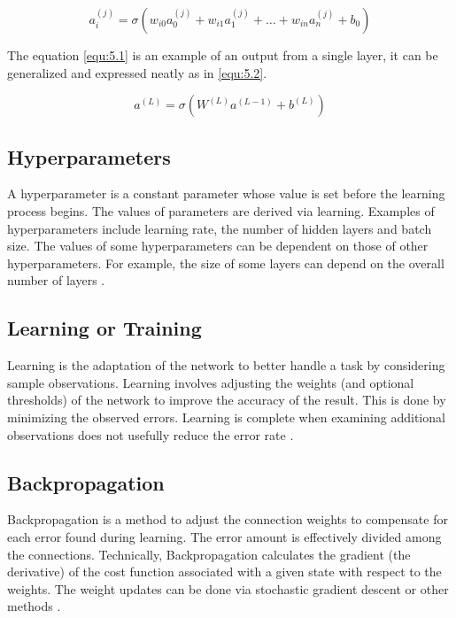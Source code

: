 \documentclass[12pt, a4paper]{report}
\begin{document}
\begin{equation}
    \label{equ:5.1}
    a_i^{(j)} = \sigma(w_{i0}a_0^{(j)} + w_{i1}a_1^{(j)} + \hdots + w_{in}a_n^{(j)} + b_0)
\end{equation}

The equation \eqref{equ:5.1} is an example of an output from a single layer, it can be generalized and expressed neatly as in \eqref{equ:5.2}.

\begin{equation}
    \label{equ:5.2}
    a^{(L)} = \sigma(W^{(L)}a^{(L-1)} + b^{(L)})
\end{equation}

\subsection{Hyperparameters}
A hyperparameter is a constant parameter whose value is set before the learning process begins. The values of parameters are derived via learning. Examples of hyperparameters include learning rate, the number of hidden layers and batch size. The values of some hyperparameters can be dependent on those of other hyperparameters. For example, the size of some layers can depend on the overall number of layers \cite{wiki:anns}.

\subsection{Learning or Training}
Learning is the adaptation of the network to better handle a task by considering sample observations. Learning involves adjusting the weights (and optional thresholds) of the network to improve the accuracy of the result. This is done by minimizing the observed errors. Learning is complete when examining additional observations does not usefully reduce the error rate \cite{wiki:anns}.

\subsection{Backpropagation}
Backpropagation is a method to adjust the connection weights to compensate for each error found during learning. The error amount is effectively divided among the connections. Technically, Backpropagation calculates the gradient (the derivative) of the cost function associated with a given state with respect to the weights. The weight updates can be done via stochastic gradient descent or other methods \cite{wiki:anns}.
\end{document}
